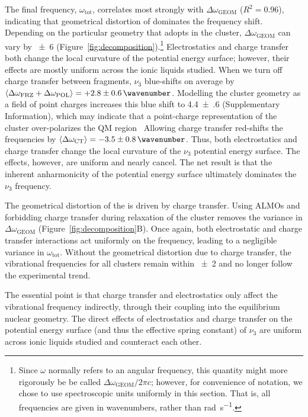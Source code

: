 \documentclass[%
  class = book,%
  crop = false,%
  float = true,%
  multi = true,%
  preview = false,%
]{standalone}
\begin{document}
{The final frequency, \(\omega_\mathrm{tot}\), correlates most strongly with \(\Delta \omega_\mathrm{GEOM}\) (\(R^2 = 0.96\)), indicating that geometrical distortion of  dominates the frequency shift. Depending on the particular geometry that  adopts in the cluster, \(\Delta \omega_\mathrm{GEOM}\) can vary by \SI{\pm 6}{\wavenumber} (Figure~\ref{fig:decomposition}).\footnote{Since \(\omega\) normally refers to an angular frequency, this quantity might more rigorously be be called \(\Delta \omega_\mathrm{GEOM} / 2 \pi c\); however, for convenience of notation, we chose to use spectroscopic units uniformly in this section. That is, all frequencies are given in wavenumbers, rather than \si{\radian\per\second}.} Electrostatics and charge transfer both change the local curvature of the potential energy surface; however, their effects are mostly uniform across the ionic liquids studied. When we turn off charge transfer between fragments, \(\nu_3\) blue-shifts on average by \(\braket{\Delta \omega_\mathrm{FRZ} + \Delta \omega_\mathrm{POL}} = \SI{+2.8(6)}{\wavenumber}\). Modelling the cluster geometry as a field of point charges increases this blue shift to \SI{+4.4(6)}{\wavenumber} (Supplementary Information), which may indicate that a point-charge representation of the cluster over-polarizes the QM region~\cite{Bakowies1996,Hu2011} Allowing charge transfer red-shifts the frequencies by \(\braket{\Delta \omega_\mathrm{CT}} = \SI{-3.5(8)}{\wavenumber}\).  Thus, both electrostatics and charge transfer change the local curvature of the \(\nu_3\) potential energy surface. The effects, however, are uniform and nearly cancel. The net result is that the inherent anharmonicity of the  potential energy surface ultimately dominates the \(\nu_3\) frequency.

The geometrical distortion of the  is driven by charge transfer. Using ALMOs and forbidding charge transfer during relaxation of the cluster removes the variance in \(\Delta \omega_\mathrm{GEOM}\) (Figure~\ref{fig:decomposition}B). Once again, both electrostatic and charge transfer interactions act uniformly on the frequency, leading to a negligible variance in \(\omega_\mathrm{tot}\). Without the geometrical distortion due to charge transfer, the vibrational frequencies for all clusters remain within \SI{\pm 2}{\wavenumber} and no longer follow the experimental trend.

The essential point is that charge transfer and electrostatics only affect the vibrational frequency indirectly, through their coupling into the equilibrium  nuclear geometry. The direct effects of electrostatics and charge transfer on the potential energy surface (and thus the effective spring constant) of \(\nu_3\) are uniform across ionic liquids studied and counteract each other.

}
\end{document}
